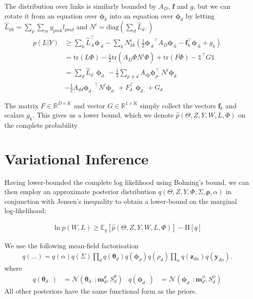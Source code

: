 \documentclass{sciposter}
\newcommand \ent[1] {
    \text{H} \left[ #1 \right]
}
\newcommand \ex[2] {
    \mathbb{E}_{ { #2 } }\left[ #1 \right]
}
\newcommand \halve[1] {
	\frac{#1}{2}
}
\newcommand \half {
    \halve{1}
}
\newcommand \tr { \text{tr} }
\newcommand \T { ^\top }
\newcommand \vv[1] { \bm #1 }
\newcommand \diag[1] { \text{diag} \left( {#1} \right) }
\newcommand \thd[0]  { { \vv \theta_d } }
\newcommand \Tr[1]   { \tr \left(  {#1}  \right) }
\newcommand \MReal[2] { { \mathbb{R}^{#1 \times #2} } }
\newcommand \one  {{  \mathds{1} }}
\newcommand \thdo { { \vv{\theta}_{d\cdot} } }
\newcommand \phok { { \vv{\phi}_{\cdot k} } }
\newcommand \phdo { { \vv{\phi}_{d\cdot} } }
\begin{document}
\begin{multicols}{3}
The distribution over links is similarly bounded by $A_D$, $\vv{f}$ and $g$, but we can rotate it from an equation over $\vv{\phi}_k$ into an equation over $\vv{\phi}_d$ by letting $\hat{L}_{dk} = \sum_p \sum_m y_{pmk} l_{pmd}$ and $N^i = \diag{\sum_d \hat{L}_{d\cdot}}$
\begin{equation*}
\begin{aligned}
p(L|Y) & \geq \sum_k \hat{L}_{\cdot k}\T \phok  - \sum_k N^i_{kk} \left(\half \phok\T A_D \phok - \vv{f}_k\T \phok + g_k\right) \\
& = \Tr{L \Phi} - \half \Tr{A_D \Phi N^i \Phi} + \Tr{F \Phi} - \one\T G \one \\
& = \sum_d \hat{L}_{d\cdot} \phdo - \half \sum_{p \neq d} A_{dp} \vv{\phi}_{p\cdot}\T N^i \phdo \\
&-\half A_{dd} \phdo\T N^i \phdo + F_{d\cdot}\T\phdo + G_{d\cdot}
\end{aligned}
\end{equation*}

The matrix $F \in \MReal{D}{K}$ and vector $G \in \MReal{1}{K}$ simply collect the vectors $\vv{f}_k$ and scalars $g_k$. This gives us a lower bound, which we denote $\hat{p}(\Theta, Z, Y, W, L, \Phi)$  on the complete probability

\section{Variational Inference}

\newcommand \mtd { { \vv{m}^{\theta}_d } }
\newcommand \std { { S^\theta_d } }
\newcommand \mpd { { \vv{m}^{\phi}_d } }
\newcommand \spd { { S^\phi_d } }

Having lower-bounded the complete log likelihood using Bohning's bound, we can then employ an approximate posterior distribution $q(\Theta, Z, Y, \Phi, \Sigma, \vv{\rho}, \alpha)$ in conjunction with Jensen's inequality to obtain a lower-bound on the marginal log-likelihood:

\begin{align*}
\ln p(W, L) \geq \ex{\hat{p}(\Theta, Z, Y, W, L, \Phi)}{q} - \ent{q}
\end{align*}

We use the following mean-field factorisation
\begin{align*}
q(\ldots) = q(\alpha)q(\Sigma)\prod_d q(\thd)q(\vv{\phi}_d)q(\rho_d)\prod_n q(\vv{z}_{dn})q(\vv{y}_{dn}).
\end{align*}
where 
\begin{align*}
q(\thdo) &= \mathcal{N}\left(\thdo; \mtd, \std \right) &
q(\phdo) &= \mathcal{N}\left(\phdo; \mpd, \spd\right) 
\end{align*}
All other posteriors have the same functional form as the priors.\\


\end{multicols}
\end{document}
